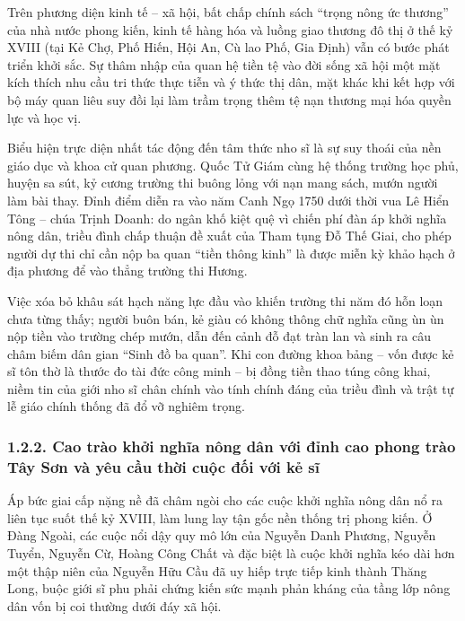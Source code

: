 Trên phương diện kinh tế -- xã hội, bất chấp chính sách ``trọng nông ức thương'' của nhà nước phong kiến, kinh tế hàng hóa và luồng giao thương đô thị ở thế kỷ XVIII (tại Kẻ Chợ, Phố Hiến, Hội An, Cù lao Phố, Gia Định) vẫn có bước phát triển khởi sắc. Sự thâm nhập của quan hệ tiền tệ vào đời sống xã hội một mặt kích thích nhu cầu tri thức thực tiễn và ý thức thị dân, mặt khác khi kết hợp với bộ máy quan liêu suy đồi lại làm trầm trọng thêm tệ nạn thương mại hóa quyền lực và học vị.

Biểu hiện trực diện nhất tác động đến tâm thức nho sĩ là sự suy thoái của nền giáo dục và khoa cử quan phương. Quốc Tử Giám cùng hệ thống trường học phủ, huyện sa sút, kỷ cương trường thi buông lỏng với nạn mang sách, mướn người làm bài thay. Đỉnh điểm diễn ra vào năm Canh Ngọ 1750 dưới thời vua Lê Hiển Tông -- chúa Trịnh Doanh: do ngân khố kiệt quệ vì chiến phí đàn áp khởi nghĩa nông dân, triều đình chấp thuận đề xuất của Tham tụng Đỗ Thế Giai, cho phép người dự thi chỉ cần nộp ba quan ``tiền thông kinh'' là được miễn kỳ khảo hạch ở địa phương để vào thẳng trường thi Hương.

Việc xóa bỏ khâu sát hạch năng lực đầu vào khiến trường thi năm đó hỗn loạn chưa từng thấy; người buôn bán, kẻ giàu có không thông chữ nghĩa cũng ùn ùn nộp tiền vào trường chép mướn, dẫn đến cảnh đỗ đạt tràn lan và sinh ra câu châm biếm dân gian ``Sinh đồ ba quan''. Khi con đường khoa bảng -- vốn được kẻ sĩ tôn thờ là thước đo tài đức công minh -- bị đồng tiền thao túng công khai, niềm tin của giới nho sĩ chân chính vào tính chính đáng của triều đình và trật tự lễ giáo chính thống đã đổ vỡ nghiêm trọng.

\subsubsection*{1.2.2. Cao trào khởi nghĩa nông dân với đỉnh cao phong trào Tây Sơn và yêu cầu thời cuộc đối với kẻ sĩ}

Áp bức giai cấp nặng nề đã châm ngòi cho các cuộc khởi nghĩa nông dân nổ ra liên tục suốt thế kỷ XVIII, làm lung lay tận gốc nền thống trị phong kiến. Ở Đàng Ngoài, các cuộc nổi dậy quy mô lớn của Nguyễn Danh Phương, Nguyễn Tuyển, Nguyễn Cừ, Hoàng Công Chất và đặc biệt là cuộc khởi nghĩa kéo dài hơn một thập niên của Nguyễn Hữu Cầu đã uy hiếp trực tiếp kinh thành Thăng Long, buộc giới sĩ phu phải chứng kiến sức mạnh phản kháng của tầng lớp nông dân vốn bị coi thường dưới đáy xã hội.

